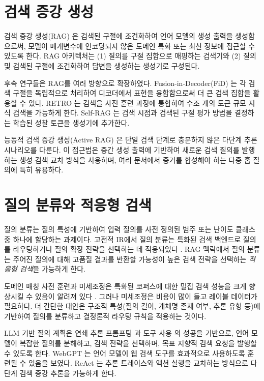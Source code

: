 \section{검색 증강 생성}
\label{sec:lit_rag_ko}

검색 증강 생성(RAG) \citep{lewis2020rag}은 검색된 구절에 조건화하여 언어 모델의 생성 출력을 생성함으로써, 모델이 매개변수에 인코딩되지 않은 도메인 특화 또는 최신 정보에 접근할 수 있도록 한다. RAG 아키텍처는 (1) 질의를 구절 집합으로 매핑하는 검색기와 (2) 질의 및 검색된 구절에 조건화하여 답변을 생성하는 생성기로 구성된다.

후속 연구들은 RAG를 여러 방향으로 확장하였다. Fusion-in-Decoder(FiD) \citep{izacard2021fid}는 각 검색 구절을 독립적으로 처리하여 디코더에서 표현을 융합함으로써 더 큰 검색 집합을 활용할 수 있다. RETRO \citep{borgeaud2022retro}는 검색을 사전 훈련 과정에 통합하여 수조 개의 토큰 규모 지식 검색을 가능하게 한다. Self-RAG \citep{asai2023selfrag}는 검색 시점과 검색된 구절 평가 방법을 결정하는 학습된 성찰 토큰을 생성기에 추가한다.

능동적 검색 증강 생성(Active RAG) \citep{jiang2023active}은 단일 검색 단계로 충분하지 않은 다단계 추론 시나리오를 다룬다. 이 접근법은 중간 생성 출력에 기반하여 새로운 검색 질의를 발행하는 생성-검색 교차 방식을 사용하며, 여러 문서에서 증거를 합성해야 하는 다중 홉 질의에 특히 유용하다.

\section{질의 분류와 적응형 검색}
\label{sec:lit_adaptive_ko}

질의 분류는 질의 특성에 기반하여 입력 질의를 사전 정의된 범주 또는 난이도 클래스 중 하나에 할당하는 과제이다. 고전적 IR에서 질의 분류는 특화된 검색 백엔드로 질의를 라우팅하거나 질의 확장 전략을 선택하는 데 적용되었다 \citep{baeza1999modern}. RAG 맥락에서 질의 분류는 주어진 질의에 대해 고품질 결과를 반환할 가능성이 높은 검색 전략을 선택하는 \emph{적응형 검색}을 가능하게 한다.

도메인 매칭 사전 훈련과 미세조정은 특화된 코퍼스에 대한 밀집 검색 성능을 크게 향상시킬 수 있음이 알려져 있다 \citep{oguz2021domain}. 그러나 미세조정은 비용이 많이 들고 레이블 데이터가 필요하다. 더 간단한 대안은 구조적 특성(질의 길이, 개체명 존재 여부, 추론 유형 등)에 기반하여 질의를 분류하고 결정론적 라우팅 규칙을 적용하는 것이다.

LLM 기반 질의 계획은 연쇄 추론 프롬프팅 \citep{wei2022chain}과 도구 사용 \citep{schick2023toolformer, yao2023react}의 성공을 기반으로, 언어 모델이 복잡한 질의를 분해하고, 검색 전략을 선택하며, 목표 지향적 검색 요청을 발행할 수 있도록 한다. WebGPT \citep{nakano2022webgpt}는 언어 모델이 웹 검색 도구를 효과적으로 사용하도록 훈련될 수 있음을 보였다. ReAct \citep{yao2023react}는 추론 트레이스와 액션 실행을 교차하는 방식으로 다단계 검색 증강 추론을 가능하게 한다.

